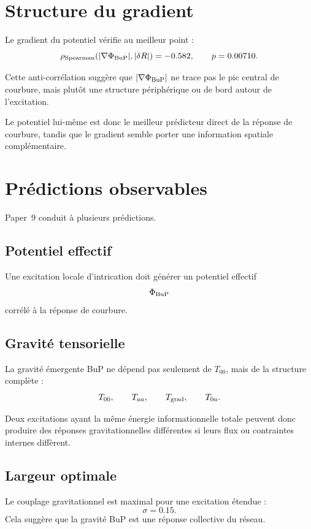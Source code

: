 \documentclass[11pt,a4paper]{article}
\begin{document}
\section{Structure du gradient}

Le gradient du potentiel vérifie au meilleur point :
\[
\rho_{\rm Spearman}(|\nabla\Phi_{\rm BuP}|,|\delta R|)
=
-0.582,
\qquad
p=0.00710.
\]

Cette anti-corrélation suggère que \(|\nabla\Phi_{\rm BuP}|\) ne trace pas le
pic central de courbure, mais plutôt une structure périphérique ou de bord
autour de l'excitation.

Le potentiel lui-même est donc le meilleur prédicteur direct de la réponse de
courbure, tandis que le gradient semble porter une information spatiale
complémentaire.

\section{Prédictions observables}

Paper~9 conduit à plusieurs prédictions.

\subsection{Potentiel effectif}

Une excitation locale d'intrication doit générer un potentiel effectif
\[
\Phi_{\rm BuP}
\]
corrélé à la réponse de courbure.

\subsection{Gravité tensorielle}

La gravité émergente BuP ne dépend pas seulement de \(T_{00}\), mais de la
structure complète :
\[
T_{00},
\qquad
T_{aa},
\qquad
T_{\rm grad},
\qquad
T_{0a}.
\]

Deux excitations ayant la même énergie informationnelle totale peuvent donc
produire des réponses gravitationnelles différentes si leurs flux ou contraintes
internes diffèrent.

\subsection{Largeur optimale}

Le couplage gravitationnel est maximal pour une excitation étendue :
\[
\sigma=0.15.
\]
Cela suggère que la gravité BuP est une réponse collective du réseau.
\end{document}
